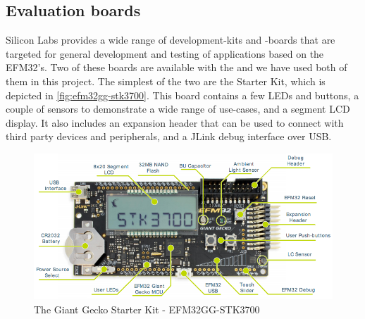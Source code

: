 
\subsection{Evaluation boards}

Silicon Labs provides a wide range of development-kits and -boards that are targeted for general development and testing of applications based on the EFM32's.
Two of these boards are available with the \gecko and we have used both of them in this project.
The simplest of the two are the  Starter Kit, which is depicted in \autoref{fig:efm32gg-stk3700}.
This board contains a few LEDs and buttons, a couple of sensors to demonstrate a wide range of use-cases, and a segment LCD display.
It also includes an expansion header that can be used to connect with third party devices and peripherals, and a JLink debug interface over USB.

\begin{figure}[H]
  \begin{center}
    \includegraphics[scale=0.4]{figures/efm32gg-stk3700}
  \end{center}
  \caption{The Giant Gecko Starter Kit - EFM32GG-STK3700 \cite{UM-STK} }
  \label{fig:efm32gg-stk3700}
\end{figure}

